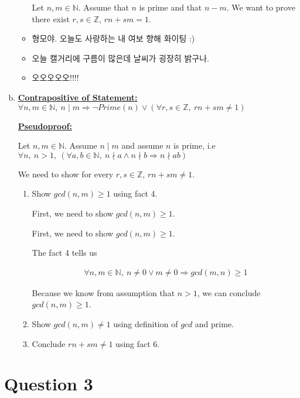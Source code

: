 \documentclass[12pt]{article}
\begin{document}
\begin{enumerate}[a.]
\begin{itemize}
        \begin{mdframed}
            Let $n, m \in \mathbb{N}$. Assume that $n$ is prime and that $n - m$.
            We want to prove there exist $r, s \in \mathbb{Z}$, $rn + sm = 1$.

        \end{mdframed}
        \item 형모야. 오늘도 사랑하는 내 여보 향해 화이팅 :)
        \item 오늘 캘거리에 구름이 많은데 날씨가 굉장히 밝구나.
        \item 오오오오오!!!!
    \end{itemize}

    \item

    \underline{\textbf{Contrapositive of Statement:}} $\forall n,m \in \mathbb{N},\:
    n \mid m \Rightarrow \neg Prime(n) \lor (\forall r,s \in \mathbb{Z},\:rn + sm \neq 1)$

    \bigskip

    \begin{mdframed}
        \underline{\textbf{Pseudoproof:}}

        \bigskip

        Let $n,m \in \mathbb{N}$. Assume $n \mid m$ and assume $n$ is prime, i.e
        $\forall n,\:n > 1,\:(\forall a,b \in \mathbb{N},\:n \nmid a \land n \nmid b \Rightarrow n \nmid ab)$

        \bigskip

        We need to show for every $r,s \in \mathbb{Z}$, $rn + sm \neq 1$.

        \bigskip

        \begin{enumerate}[1.]
            \item Show $gcd(n,m) \geq 1$ using fact 4.

            First, we need to show $gcd(n,m) \geq 1$.

            \begin{mdframed}
            First, we need to show $gcd(n,m) \geq 1$.

            \bigskip

            The fact 4 tells us

            \begin{align}
                \forall n,m \in \mathbb{N},\: n \neq 0 \lor m \neq 0 \Rightarrow gcd(m,n) \geq 1
            \end{align}

            \bigskip

            Because we know from assumption that $n > 1$, we can conclude
            $gcd(n,m) \geq 1$.
            \end{mdframed}

            \item Show $gcd(n,m) \neq 1$ using definition of $gcd$ and prime.
            \item Conclude $rn + sm \neq 1$ using fact 6.
        \end{enumerate}
    \end{mdframed}

\end{enumerate}

\section*{Question 3}
\end{document}
